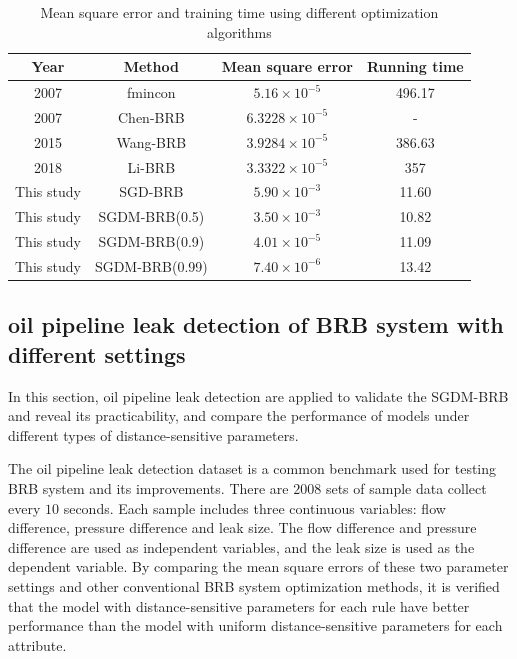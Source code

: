 \documentclass{ieeeaccess}
\begin{document}
\begin{table}
    \caption{Mean square error and training time using different optimization algorithms}
    \centering
    \label{tab3}
    \begin{tabular}{cccc}
        \hline
        Year       & Method             & Mean square error     & Running time \\
        \hline
        2007       & fmincon\cite{a10}  & $5.16\times10^{-5}$   & 496.17       \\
        2007       & Chen-BRB\cite{a13} & $6.3228\times10^{-5}$ & -            \\
        2015       & Wang-BRB\cite{a15} & $3.9284\times10^{-5}$ & 386.63       \\
        2018       & Li-BRB\cite{a36}   & $3.3322\times10^{-5}$ & 357          \\
        This study & SGD-BRB            & $5.90\times10^{-3}$   & 11.60        \\
        This study & SGDM-BRB(0.5)      & $3.50\times10^{-3}$   & 10.82        \\
        This study & SGDM-BRB(0.9)      & $4.01\times10^{-5}$   & 11.09        \\
        This study & SGDM-BRB(0.99)     & $7.40\times10^{-6}$   & 13.42        \\
        \hline
    \end{tabular}
\end{table}

\subsection{oil pipeline leak detection of BRB system with different settings}
In this section, oil pipeline leak detection are applied to validate the SGDM-BRB and reveal its practicability,
and compare the performance of models under different types of distance-sensitive parameters.

The oil pipeline leak detection dataset is a common benchmark used for testing BRB system and its improvements.
There are $2008$ sets of sample data collect every $10$ seconds. Each sample includes three continuous variables: flow difference, pressure difference and leak size.
The flow difference and pressure difference are used as independent variables, and the leak size is used as the dependent variable.
By comparing the mean square errors of these two parameter settings and other conventional BRB system optimization methods,
it is verified that the model with distance-sensitive parameters for each rule have better performance than the model with uniform distance-sensitive parameters for each attribute.
\end{document}
